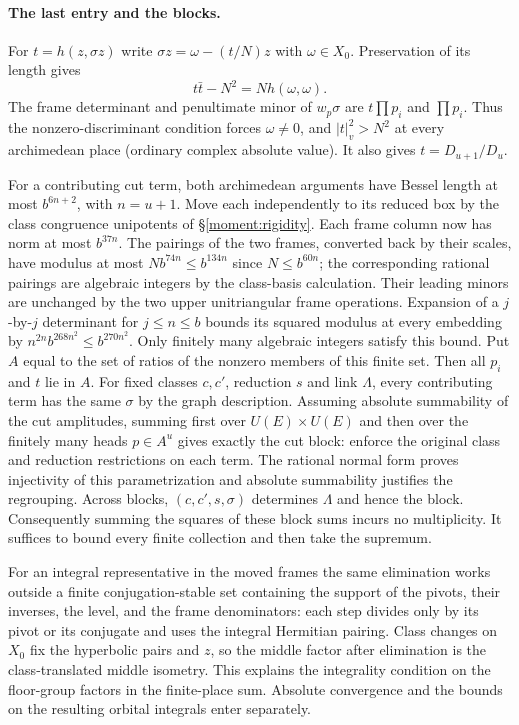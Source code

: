 \paragraph{The last entry and the blocks.}
For $t=h(z,\sigma z)$ write $\sigma z=\omega-(t/N)z$ with
$\omega\in X_0$. Preservation of its length gives
\[
        t\bar t-N^2=N h(\omega,\omega).
\]
The frame determinant and penultimate minor of $w_p\sigma$ are
$t\prod p_i$ and $\prod p_i$. Thus the nonzero-discriminant
condition forces $\omega\ne0$, and $|t|_v^2>N^2$ at every
archimedean place (ordinary complex absolute value). It also gives
$t=D_{u+1}/D_u$.

For a contributing cut term, both archimedean arguments have Bessel
length at most $b^{6n+2}$, with $n=u+1$. Move each independently to
its reduced box by the class congruence unipotents of
\S\ref{moment:rigidity}. Each frame column now has norm at most
$b^{37n}$. The pairings of the two frames, converted back by their
scales, have modulus at most $Nb^{74n}\le b^{134n}$ since
$N\le b^{60n}$; the corresponding rational pairings are algebraic
integers by the class-basis calculation. Their leading minors are
unchanged by the two upper unitriangular frame operations. Expansion
of a $j$-by-$j$ determinant for $j\le n\le b$ bounds its squared
modulus at every embedding by $n^{2n}b^{268n^2}\le b^{270n^2}$.
Only finitely many algebraic integers satisfy this bound. Put $A$
equal to the set of ratios of the nonzero members of this finite set. Then all
$p_i$ and $t$ lie in $A$. For fixed classes $c,c'$, reduction $s$ and
link $\Lambda$, every contributing term has the same $\sigma$ by
the graph description. Assuming absolute summability of the cut amplitudes, summing first over $U(E)\times U(E)$ and then
over the finitely many heads $p\in A^u$ gives exactly the cut block:
enforce the original class and reduction restrictions on each term.
The rational normal form proves injectivity of this parametrization
and absolute summability justifies the regrouping. Across blocks,
$(c,c',s,\sigma)$ determines $\Lambda$ and hence the block.
Consequently summing the squares of these block sums incurs no
multiplicity. It suffices to bound every finite collection and then
take the supremum.

For an integral representative in the moved frames the same elimination
works outside a finite conjugation-stable set containing the support
of the pivots, their inverses, the level, and the frame denominators:
each step divides only by its pivot or its conjugate and uses the
integral Hermitian pairing. Class changes on $X_0$ fix the hyperbolic
pairs and $z$, so the middle factor after elimination is the
class-translated middle isometry. This explains the integrality
condition on the floor-group factors in the finite-place sum. Absolute convergence and the bounds on the resulting orbital integrals enter separately.

